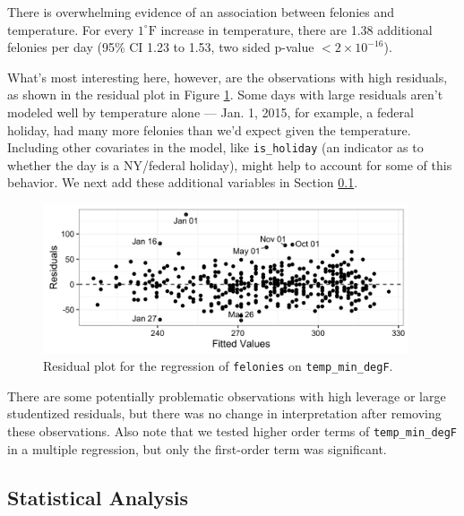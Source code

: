 \documentclass[11pt,notitlepage]{article}
\newcommand{\degf}{^\circ\text{F}}
\begin{document}

There is overwhelming evidence of an association between felonies and temperature. For every $1 \degf$ increase in temperature, there are 1.38 additional felonies per day (95\% CI 1.23 to 1.53, two sided p-value $<2\times10^{-16}$).

What's most interesting here, however, are the observations with high residuals, as shown in the residual plot in Figure \ref{fig:lm1Residuals}. Some days with large residuals aren't modeled well by temperature alone --- Jan. 1, 2015, for example, a federal holiday, had many more felonies than we'd expect given the temperature. Including other covariates in the model, like \texttt{is_holiday} (an indicator as to whether the day is a NY/federal holiday), might help to account for some of this behavior. We next add these additional variables in Section \ref{sec:modelFeloniesMultipleRegression}.

\begin{figure}[!h]
  \vspace*{-3mm}
	\centering
	\captionsetup{width=0.9\textwidth}
	\includegraphics[width=4.25in]{figures/lm1Residuals.png}
	\vspace*{-3mm}
	\caption{Residual plot for the regression of \texttt{felonies} on \texttt{temp_min_degF}.}
	\label{fig:lm1Residuals}
	\vspace*{-3mm}
\end{figure}


There are some potentially problematic observations with high leverage or large studentized residuals, but there was no change in interpretation after removing these observations. Also note that we tested higher order terms of \texttt{temp_min_degF} in a multiple regression, but only the first-order term was significant.


\subsection{Statistical Analysis}
\label{sec:modelFeloniesMultipleRegression}
\end{document}
